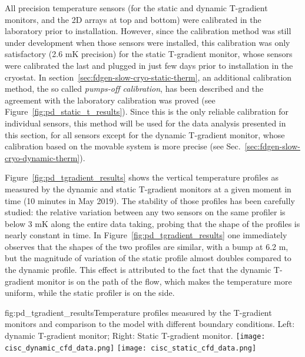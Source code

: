All precision temperature sensors (for the static and dynamic T-gradient monitors,  and the 2D arrays at top and bottom) were calibrated in the laboratory prior to installation. However, since the calibration method was still under development when those sensors 
were installed, this calibration was only satisfactory (2.6 mK precision) for the static T-gradient monitor, whose sensors were calibrated the last and  plugged in just few days prior to installation in the cryostat. In section~\ref{sec:fdgen-slow-cryo-static-therm}, an additional calibration method, the so called {\it pumps-off calibration}, has been described and the agreement with the laboratory calibration was proved (see Figure~\ref{fig:pd_static_t_results}). Since this is the only reliable calibration for individual sensors, this method will be used for the data analysis presented in this section, for all sensors except for the dynamic T-gradient monitor, whose calibration based on the movable system is more precise (see Sec.~\ref{sec:fdgen-slow-cryo-dynamic-therm}). 


Figure~\ref{fig:pd_tgradient_results} shows the vertical temperature profiles as measured by the dynamic and static T-gradient monitors at a given moment in time (10 minutes in May 2019). The stability of those profiles has been carefully studied: the relative variation between any two sensors on the same profiler is below 3 mK along the entire data taking, probing that the shape of the profiles is nearly constant in time. In Figure~\ref{fig:pd_tgradient_results} one immediately observes that the shapes of the two profiles are similar, with a bump at 6.2 m, but the magnitude of %
variation of the static profile almost doubles %
compared to the dynamic profile. This effect is attributed to the fact that the dynamic T-gradient monitor is on the path of the \lar flow, which makes the temperature more uniform, while the static profiler is on the side.  

\begin{dunefigure}{fig:pd_tgradient_results}{Temperature profiles measured by the T-gradient monitors and comparison to the  model with different boundary conditions. Left: dynamic T-gradient monitor; Right: Static T-gradient monitor.}
  \texttt{[image: cisc\_dynamic\_cfd\_data.png]}%
  \texttt{[image: cisc\_static\_cfd\_data.png]}%
\end{dunefigure}

